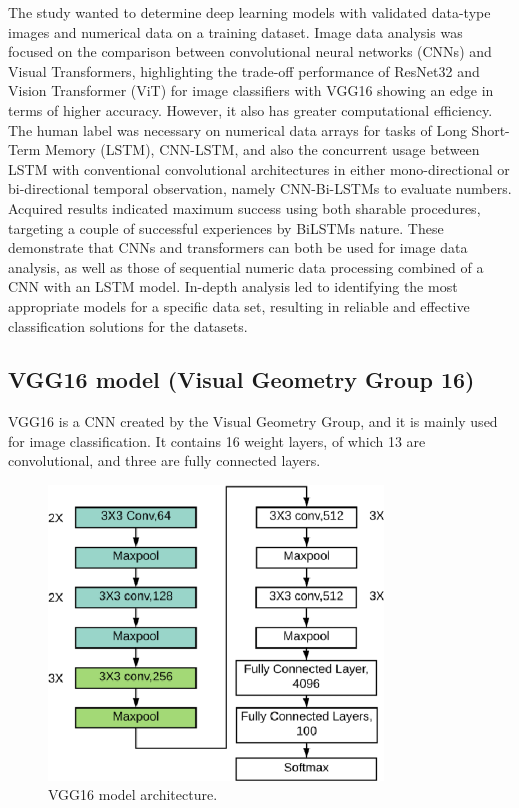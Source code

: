 \documentclass[conference]{IEEEtran}
\begin{document}
The study wanted to determine deep learning models with validated data-type images and numerical data on a training dataset. Image data analysis was focused on the comparison between convolutional neural networks (CNNs) and Visual Transformers, highlighting the trade-off performance of ResNet32 and Vision Transformer (ViT) for image classifiers with VGG16 showing an edge in terms of higher accuracy. However, it also has greater computational efficiency. The human label was necessary on numerical data arrays for tasks of Long Short-Term Memory (LSTM), CNN-LSTM, and also the concurrent usage between LSTM with conventional convolutional architectures in either mono-directional or bi-directional temporal observation, namely CNN-Bi-LSTMs to evaluate numbers. Acquired results indicated maximum success using both sharable procedures, targeting a couple of successful experiences by BiLSTMs nature. These demonstrate that CNNs and transformers can both be used for image data analysis, as well as those of sequential numeric data processing combined of a CNN with an LSTM model. In-depth analysis led to identifying the most appropriate models for a specific data set, resulting in reliable and effective classification solutions for the datasets.


\subsection{VGG16 model (Visual Geometry Group 16)}

VGG16 is a CNN created by the Visual Geometry Group, and it is mainly used for image classification. It contains 16 weight layers, of which 13 are convolutional, and three are fully connected layers.



\begin{figure}[htbp]
\centerline{\includegraphics[width=3.5in]{8-VGG16.png}}
\caption{VGG16 model architecture.}
\label{fig-8:VGG16}
\end{figure}
\end{document}
